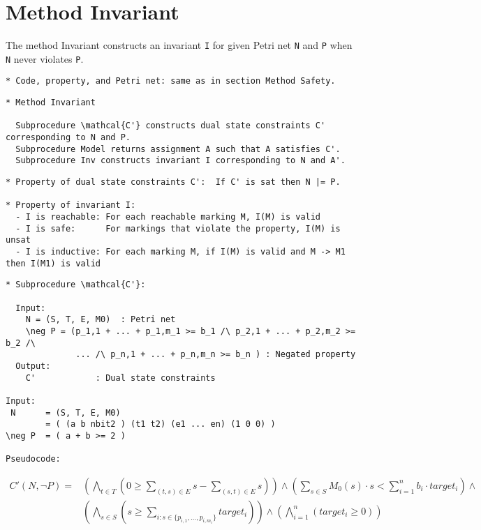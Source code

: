 \documentclass{llncs}
\begin{document}
\newpage

\section{Method Invariant}

The method Invariant constructs an invariant \verb=I= for given Petri
net \verb=N= and \verb=P= when \verb=N= never violates \verb=P=.

\begin{verbatim}
* Code, property, and Petri net: same as in section Method Safety.
\end{verbatim}

\begin{verbatim}
* Method Invariant

  Subprocedure \mathcal{C'} constructs dual state constraints C' corresponding to N and P.
  Subprocedure Model returns assignment A such that A satisfies C'.
  Subprocedure Inv constructs invariant I corresponding to N and A'.
\end{verbatim}





\begin{verbatim}
* Property of dual state constraints C':  If C' is sat then N |= P.

* Property of invariant I:
  - I is reachable: For each reachable marking M, I(M) is valid
  - I is safe:      For markings that violate the property, I(M) is unsat
  - I is inductive: For each marking M, if I(M) is valid and M -> M1 then I(M1) is valid
\end{verbatim}

\newpage

\begin{verbatim}
* Subprocedure \mathcal{C'}:

  Input:
    N = (S, T, E, M0)  : Petri net
    \neg P = (p_1,1 + ... + p_1,m_1 >= b_1 /\ p_2,1 + ... + p_2,m_2 >= b_2 /\
              ... /\ p_n,1 + ... + p_n,m_n >= b_n ) : Negated property
  Output:
    C'            : Dual state constraints

Input:
 N      = (S, T, E, M0)
        = ( (a b nbit2 ) (t1 t2) (e1 ... en) (1 0 0) )
\neg P  = ( a + b >= 2 )

Pseudocode:
\end{verbatim}

\begin{align*}
  C'(N, \neg P) =& \left( \bigwedge_{t \in T} \left( 0 \ge
                      \sum_{(t, s) \in E} s
                    - \sum_{(s, t) \in E} s \right) \right) \land
     \left( \sum_{s \in S} M_0(s) \cdot s <
       \sum_{i=1}^n b_i \cdot target_i \right) \land \\
     & \left( \bigwedge_{s \in S} \left ( s \ge 
       \sum_{i : s \in \{ p_{i,1}, \ldots, p_{i,m_i} \} } target_i \right) \right) \land
     \left( \bigwedge_{i=1}^n \left( target_i \ge 0 \right) \right)
\end{align*}
\end{document}
